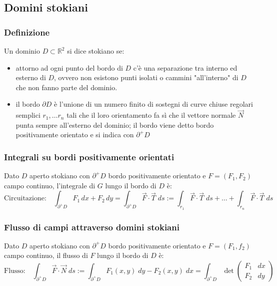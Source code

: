 \documentclass[a4paper]{article}
\newcommand\Rd{\mathbb{R}^2}  %
\begin{document}
\subsection{Domini stokiani}
\subsubsection*{Definizione}
Un dominio \(D \subset \Rd\) si dice stokiano se:
\begin{itemize}
	\item attorno ad ogni punto del bordo di \(D\) c'è una separazione tra interno ed esterno di \(D\), ovvero non esistono punti
	isolati o cammini "all'interno" di \(D\) che non fanno parte del dominio.
	\item il bordo \(\partial D\) è l'unione di un numero finito di sostegni di curve chiuse regolari semplici \(r_1, \dots r_n\)
	tali che il loro orientamento fa sì che il vettore normale \(\vec{N}\) punta sempre all'esterno del dominio; il bordo viene
	detto bordo positivamente orientato e si indica con \(\partial^+D\)
\end{itemize}

\subsubsection*{Integrali su bordi positivamente orientati}
Dato \(D\) aperto stokiano con \(\partial^+D\) bordo positivamente orientato e \(F = (F_1,F_2)\) campo continuo, l'integrale di \(G\)
lungo il bordo di \(D\) è:
\[\text{Circuitazione:} \quad \int_{\partial^+D} F_1 \, dx + F_2 \, dy = \int_{\partial^+D} \vec{F} \cdot \vec{T} \; ds := \int_{r_1} \vec{F} \cdot \vec{T} \; ds + \dots + \int_{r_n} \vec{F} \cdot \vec{T} \; ds\]

\subsubsection*{Flusso di campi attraverso domini stokiani}
Dato \(D\) aperto stokiano con \(\partial^+D\) bordo positivamente orientato e \(F = (F_1,f_2)\) campo continuo, il flusso di \(F\)
lungo il bordo di \(D\) è:
\[\text{Flusso:} \quad \int_{\partial^+D} \vec{F} \cdot \vec{N} \; ds := \int_{\partial^+D} F_1(x,y) \; dy - F_2(x,y) \; dx = \int_{\partial^+D} \det \left(\begin{matrix} F_1 & dx \\ F_2 & dy \end{matrix}\right)\]

\newpage
\end{document}
